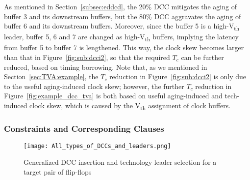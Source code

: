 As mentioned in Section~\ref{subsec:eddcd}, the 20\% DCC mitigates the aging of buffer 3 and its downstream buffers, but the 80\% DCC aggravates the aging of buffer 6 and its downstream buffers. Moreover, since the buffer 5 is a high-V\textsubscript{th} leader, buffer 5, 6 and 7 are changed as high-V\textsubscript{th} buffers, implying the latency from buffer 5 to buffer 7 is lengthened. This way, the clock skew becomes larger than that in Figure~\ref{fig:sub:dcci2}, so that the required $T_c$ can be further reduced, based on timing borrowing. Note that, as we mentioned in Section~\ref{sec:TVA:example}, the $T_c$ reduction in Figure~\ref{fig:sub:dcci2} is only due to the useful aging-induced clock skew; however, the  further $T_c$ reduction in Figure~\ref{fig:example_dcc_tva} is both based on useful aging-induced and tech-induced clock skew, which is caused by the V\textsubscript{th} assignment of clock buffers. 

\subsubsection{Constraints and Corresponding Clauses}
\label{sec:TVA:leaderconstraint}
\begin{figure}
    \centering
    \texttt{[image: All\_types\_of\_DCCs\_and\_leaders.png]}
    \caption{Generalized DCC insertion and technology leader selection for a target pair of flip-flops}
    \label{fig:g_dcc_leader}
\end{figure}

